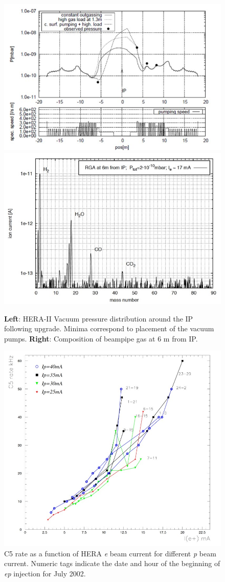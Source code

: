 
\begin{figure}[!hbt]
	\centering
	\includegraphics[width=.48\textwidth]{../../img/hera_badvac_regions.jpg}
	\includegraphics[width=.48\textwidth]{../../img/hera_badvac_comp.jpg}	
	\caption {\textbf{Left}: HERA-II Vacuum pressure distribution around the IP following upgrade.  Minima correspond to placement of the vacuum pumps. \textbf{Right}: Composition of beampipe gas at 6 m from IP. }
	\label{fig:hera2}
\end{figure}



\begin{figure}[!hbt]
	\centering
	\includegraphics[width=.65\textwidth]{../../img/hera_c5_rate.jpg}
	\caption{C5 rate as a function of HERA \textit{e} beam current for different \textit{p} beam current.  Numeric tags indicate the date and hour of the beginning of \textit{ep} injection for July 2002.}
	\label{fig:hera3}
\end{figure}


